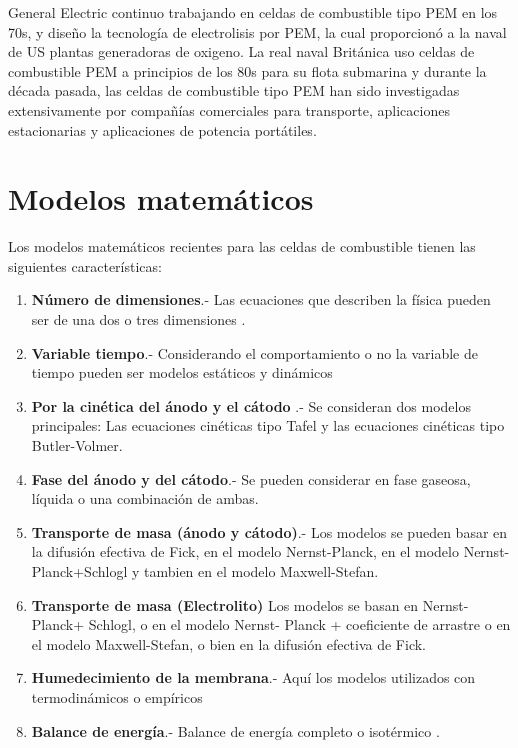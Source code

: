 \documentclass[12pt]{book}
\theoremstyle{definition}
\theoremstyle{remark}
\theoremstyle{plain}
\begin{document}
General Electric continuo trabajando en celdas de combustible tipo PEM en los 70s, y diseño
la tecnología de electrolisis por PEM, la cual proporcionó a la naval de US plantas 
generadoras de oxigeno. La real naval Británica uso celdas de combustible PEM a principios
de los 80s para su flota submarina y durante la década pasada, las celdas de combustible 
tipo PEM han sido investigadas extensivamente por compañías comerciales para transporte, 
aplicaciones estacionarias y aplicaciones de potencia portátiles.


\section{Modelos matemáticos}

Los modelos matemáticos recientes para las celdas de combustible tienen las siguientes características:

\begin{enumerate}
\item  \textbf{Número de dimensiones}.- Las ecuaciones que describen la física pueden ser de una dos o tres dimensiones .
\item \textbf{Variable tiempo}.- Considerando el comportamiento o no la variable de tiempo pueden ser modelos estáticos y dinámicos
\item  \textbf{Por la cinética del ánodo y el cátodo} .- Se consideran dos modelos principales: Las ecuaciones cinéticas tipo Tafel y las ecuaciones cinéticas tipo Butler-Volmer.
\item  \textbf{Fase del ánodo y del cátodo}.- Se pueden considerar en fase gaseosa, líquida o una combinación de ambas.

\item  \textbf{Transporte de masa (ánodo y cátodo)}.- Los modelos se pueden basar en la difusión efectiva de Fick, en el modelo Nernst-Planck, en el modelo Nernst-Planck+Schlogl y tambien en el modelo Maxwell-Stefan.

\item  \textbf{Transporte de masa (Electrolito)} Los modelos se basan en Nernst-Planck+ Schlogl, o en el modelo Nernst-
Planck + coeficiente de arrastre o en el modelo Maxwell-Stefan, o bien en  la difusión efectiva de Fick.

\item \textbf{Humedecimiento de la membrana}.- Aquí los modelos utilizados con termodinámicos o empíricos

\item \textbf{Balance de energía}.- Balance de energía completo o isotérmico \cite{Mase1999} .
\end{enumerate}




\backmatter
\end{document}
